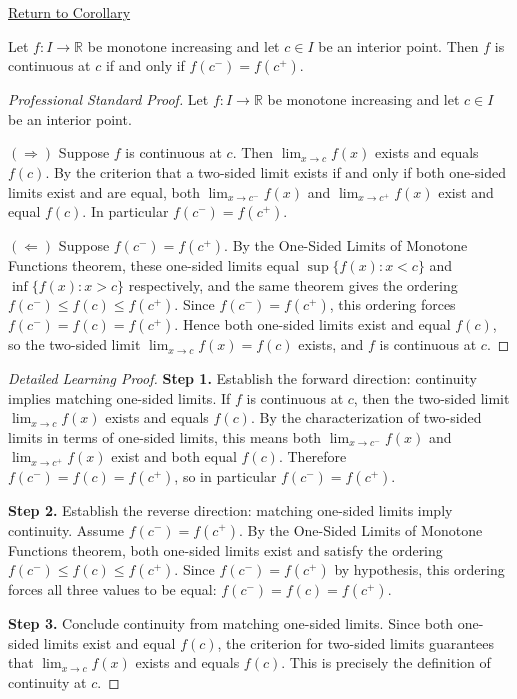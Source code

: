 \newpage
{}
\label{prf:monotone-continuity-criterion}

\begin{remark*}[Return]
\hyperref[cor:monotone-continuity-criterion]{Return to Corollary}
\end{remark*}

\begin{corollary*}
Let $f : I \to \mathbb{R}$ be monotone increasing and let $c \in I$ be an interior point. Then $f$ is continuous at $c$ if and only if $f(c^{-}) = f(c^{+})$.
\end{corollary*}

\begin{proof}[Professional Standard Proof]
\LRAProofBodyStart
Let $f : I \to \mathbb{R}$ be monotone increasing and let $c \in I$ be an interior point.

$(\Rightarrow)$ Suppose $f$ is continuous at $c$. Then $\lim_{x \to c} f(x)$ exists and equals $f(c)$. By the criterion that a two-sided limit exists if and only if both one-sided limits exist and are equal, both $\lim_{x \to c^{-}} f(x)$ and $\lim_{x \to c^{+}} f(x)$ exist and equal $f(c)$. In particular $f(c^{-}) = f(c^{+})$.

$(\Leftarrow)$ Suppose $f(c^{-}) = f(c^{+})$. By the One-Sided Limits of Monotone Functions theorem, these one-sided limits equal $\sup\{f(x) : x < c\}$ and $\inf\{f(x) : x > c\}$ respectively, and the same theorem gives the ordering $f(c^{-}) \leq f(c) \leq f(c^{+})$. Since $f(c^{-}) = f(c^{+})$, this ordering forces $f(c^{-}) = f(c) = f(c^{+})$. Hence both one-sided limits exist and equal $f(c)$, so the two-sided limit $\lim_{x \to c} f(x) = f(c)$ exists, and $f$ is continuous at $c$.
\end{proof}

\begin{proof}[Detailed Learning Proof]
\LRAProofBodyStart

\textbf{Step 1.} Establish the forward direction: continuity implies matching one-sided limits. If $f$ is continuous at $c$, then the two-sided limit $\lim_{x \to c} f(x)$ exists and equals $f(c)$. By the characterization of two-sided limits in terms of one-sided limits, this means both $\lim_{x \to c^{-}} f(x)$ and $\lim_{x \to c^{+}} f(x)$ exist and both equal $f(c)$. Therefore $f(c^{-}) = f(c) = f(c^{+})$, so in particular $f(c^{-}) = f(c^{+})$.

\textbf{Step 2.} Establish the reverse direction: matching one-sided limits imply continuity. Assume $f(c^{-}) = f(c^{+})$. By the One-Sided Limits of Monotone Functions theorem, both one-sided limits exist and satisfy the ordering $f(c^{-}) \leq f(c) \leq f(c^{+})$. Since $f(c^{-}) = f(c^{+})$ by hypothesis, this ordering forces all three values to be equal: $f(c^{-}) = f(c) = f(c^{+})$.

\textbf{Step 3.} Conclude continuity from matching one-sided limits. Since both one-sided limits exist and equal $f(c)$, the criterion for two-sided limits guarantees that $\lim_{x \to c} f(x)$ exists and equals $f(c)$. This is precisely the definition of continuity at $c$.
\end{proof}

